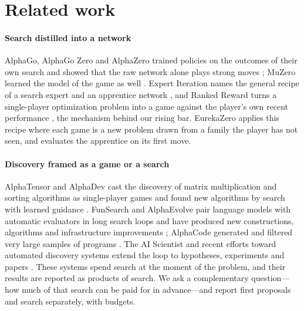 \section{Related work}
\label{sec:related}

\paragraph{Search distilled into a network} AlphaGo, AlphaGo Zero and AlphaZero trained policies on
the outcomes of their own search and showed that the raw network alone plays strong moves
\citep{silver2016alphago,silver2017zero,silver2018alphazero}; MuZero learned the model of the game as
well \citep{schrittwieser2020muzero}. Expert Iteration names the general recipe of a search expert
and an apprentice network \citep{anthony2017exit}, and Ranked Reward turns a single-player
optimization problem into a game against the player's own recent performance
\citep{laterre2018ranked}, the mechanism behind our rising bar. EurekaZero applies this recipe where
each game is a new problem drawn from a family the player has not seen, and evaluates the apprentice
on its first move.

\paragraph{Discovery framed as a game or a search} AlphaTensor and AlphaDev cast the discovery of
matrix multiplication and sorting algorithms as single-player games and found new algorithms by
search with learned guidance \citep{fawzi2022alphatensor,mankowitz2023alphadev}. FunSearch and
AlphaEvolve pair language models with automatic evaluators in long search loops and have produced
new constructions, algorithms and infrastructure improvements
\citep{romeraparedes2024funsearch,novikov2025alphaevolve,deepmind2026alphaevolve}; AlphaCode
generated and filtered very large samples of programs \citep{li2022alphacode}. The AI Scientist and
recent efforts toward automated discovery systems extend the loop to hypotheses, experiments and
papers \citep{lu2024aiscientist,socher2026eureka,recursive2026firststeps}. These systems spend search
at the moment of the problem, and their results are reported as products of search. We ask a
complementary question---how much of that search can be paid for in advance---and report first
proposals and search separately, with budgets.

